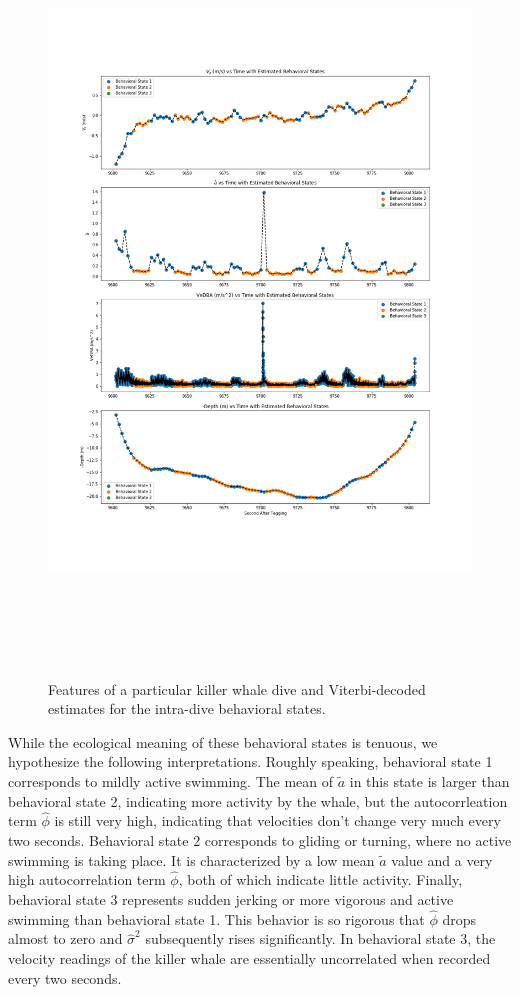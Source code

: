 \begin{figure}[h!]
	\centering
	\includegraphics[height=8in]{../Plots/viterbi.png}
	\caption{Features of a particular killer whale dive and Viterbi-decoded estimates for the intra-dive behavioral states.}
	\label{fig:viterbi}
\end{figure}

While the ecological meaning of these behavioral states is tenuous, we hypothesize the following interpretations. Roughly speaking, behavioral state 1 corresponds to mildly active swimming. The mean of $\tilde a$ in this state is larger than behavioral state 2, indicating more activity by the whale, but the autocorrleation term $\hat \phi$ is still very high, indicating that velocities don't change very much every two seconds. Behavioral state 2 corresponds to gliding or turning, where no active swimming is taking place. It is characterized by a low mean $\tilde a$ value and a very high autocorrelation term $\hat \phi$, both of which indicate little activity. Finally, behavioral state 3 represents sudden jerking or more vigorous and active swimming than behavioral state 1. This behavior is so rigorous that $\hat \phi$ drops almost to zero and $\hat \sigma^2$ subsequently rises significantly. In behavioral state 3, the velocity readings of the killer whale are essentially uncorrelated when recorded every two seconds.

